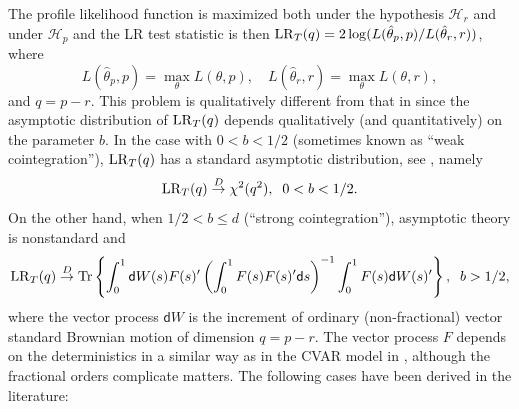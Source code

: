 \documentclass[10pt]{article}
\def\lrt{{\rm LR}_T}
\begin{document}
The profile likelihood function is maximized both under the hypothesis $\mathcal{H}_{r}$ and under $\mathcal{H}_{p}$ and the LR test statistic is then $\lrt(q)=2\log(L(\hat{\theta}_{p},p)/L(\hat{\theta}_{r},r))$, where 
\begin{equation*}
L(\hat{\theta}_{p},p)=\max_{\theta}L(\theta,p), \quad L(\hat{\theta}_{r},r)=\max_{\theta}L(\theta,r),
\end{equation*}
and $q=p-r$. This problem is qualitatively different from that in \cite{Johansen1995} since the asymptotic distribution of $\lrt(q)$ depends qualitatively (and quantitatively) on the parameter $b$. In the case with $0<b<1/2$ (sometimes known as \textquotedblleft weak cointegration\textquotedblright ), $\lrt(q)$ has a standard asymptotic distribution, see \citet[Theorem 11(ii)]{johansen2012likelihood}, namely 
\begin{equation}
\lrt(q)\overset{D}{\rightarrow }\chi ^{2}(q^{2}), \; \; 0<b<1/2.
\end{equation}
On the other hand, when $1/2<b\leq d$ (\textquotedblleft strong cointegration\textquotedblright ), asymptotic theory is nonstandard and 
\begin{equation}
\lrt(q)\overset{D}{\rightarrow }\mathrm{Tr}\left\{
\int_{0}^{1}\mathsf{d}W(s)F(s)^{\prime }\left( \int_{0}^{1}F(s)F(s)^{\prime}\mathsf{d}s\right) ^{-1}
\int_{0}^{1}F(s)\mathsf{d}W(s)^{\prime }\right\}, \; \; b>1/2,
\label{LR asy distr}
\end{equation}
where the vector process $\mathsf{d}W$ is the increment of ordinary (non-fractional) vector standard Brownian motion of dimension $q=p-r$. The vector process $F$ depends on the deterministics in a similar way as in the CVAR model in \cite{Johansen1995}, although the fractional orders complicate matters. The following cases have been derived in the literature:
\end{document}
